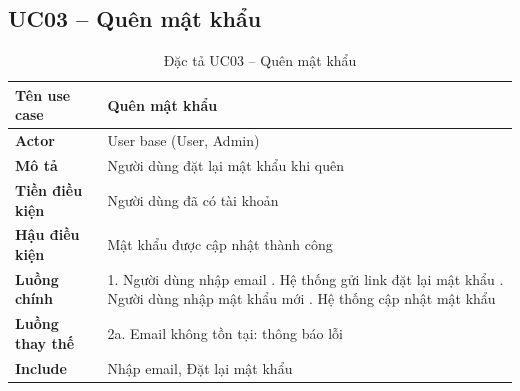 \subsection*{UC03 -- Quên mật khẩu}
\begin{table}[H]
    \captionsetup{justification=raggedright, singlelinecheck=false}
    \caption{Đặc tả UC03 -- Quên mật khẩu}
\centering
\begin{tabular}{|p{3.5cm}|p{10cm}|}
\hline
\textbf{Tên use case} & Quên mật khẩu \\
\hline
\textbf{Actor} & User base (User, Admin) \\
\hline
\textbf{Mô tả} & Người dùng đặt lại mật khẩu khi quên \\
\hline
\textbf{Tiền điều kiện} & Người dùng đã có tài khoản \\
\hline
\textbf{Hậu điều kiện} & Mật khẩu được cập nhật thành công \\
\hline
\textbf{Luồng chính} &
  1. Người dùng nhập email \newline
  2. Hệ thống gửi link đặt lại mật khẩu \newline
  3. Người dùng nhập mật khẩu mới \newline
  4. Hệ thống cập nhật mật khẩu \\
\hline
\textbf{Luồng thay thế} &
  2a. Email không tồn tại: thông báo lỗi \\
\hline
\textbf{Include} & Nhập email, Đặt lại mật khẩu \\
\hline
\end{tabular}
\end{table}


